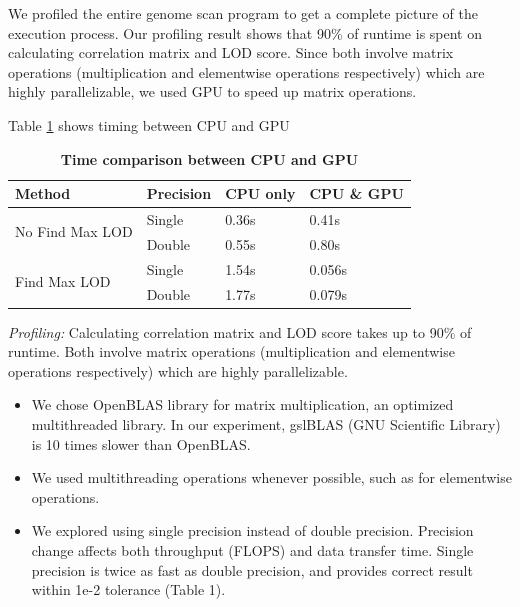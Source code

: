 \documentclass[9pt,twocolumn,twoside,lineno]{gsag3jnl}
\begin{document}
We profiled the entire genome scan program to get a complete picture of the execution process.
Our profiling result shows that 90\% of runtime is spent on calculating correlation matrix and LOD score. 
Since both involve matrix operations (multiplication and elementwise operations respectively) which are highly parallelizable, we used GPU to speed up matrix operations. 

Table \ref{tab:speedup-table} shows timing between CPU and GPU  

\begin{table}[htbp]
	\renewcommand{\familydefault}{\sfdefault}\normalfont
	\centering
	\caption{\bf Time comparison between CPU and GPU}
	\begin{tableminipage}{\textwidth}
		\begin{tabularx}{\textwidth}{XXXX}
			\hline
			\header Method & Precision & CPU only   & CPU \& GPU  \\
			\hline
			\multirow{2}{*}{No Find Max LOD} & Single    & 0.36s & 0.41s \\
			& Double    & 0.55s & 0.80s \\
			\multirow{2}{*}{Find Max LOD}    & Single    &1.54s       &0.056s       \\
			& Double    & 1.77s & 0.079s \\
			\hline
			 
		\end{tabularx}
		\label{tab:speedup-table}
	\end{tableminipage}
\end{table}





{\em Profiling:} Calculating correlation matrix and LOD score
takes up to 90\% of runtime.  Both involve matrix operations
(multiplication and elementwise operations respectively) which
are highly parallelizable.
      \begin{itemize}
	\item We chose OpenBLAS library for matrix multiplication, an
	optimized multithreaded library.  In our experiment, gslBLAS
	(GNU Scientific Library) is 10 times slower than OpenBLAS.
	\item We used multithreading operations whenever possible, such as
	for elementwise operations.
	\item We explored using single precision instead of double
	precision.  Precision change affects both throughput (FLOPS) and
	data transfer time.  Single precision is twice
	as fast as double precision, and provides correct result
	within 1e-2 tolerance (Table 1).
\end{itemize}
\end{document}

